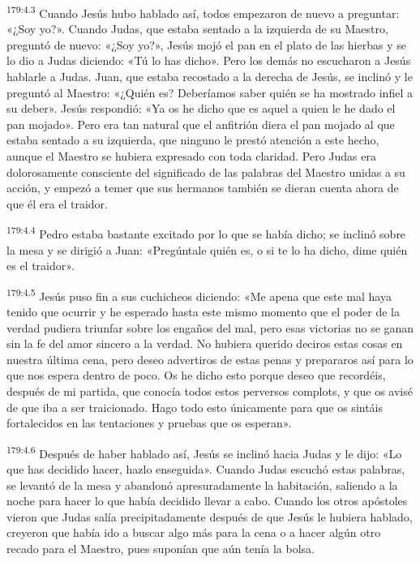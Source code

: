 \par 
\textsuperscript{179:4.3} Cuando Jesús hubo hablado así, todos empezaron de nuevo a preguntar: «¿Soy yo?». Cuando Judas, que estaba sentado a la izquierda de su Maestro, preguntó de nuevo: «¿Soy yo?», Jesús mojó el pan en el plato de las hierbas y se lo dio a Judas diciendo: «Tú lo has dicho». Pero los demás no escucharon a Jesús hablarle a Judas. Juan, que estaba recostado a la derecha de Jesús, se inclinó y le preguntó al Maestro: «¿Quién es? Deberíamos saber quién se ha mostrado infiel a su deber». Jesús respondió: «Ya os he dicho que es aquel a quien le he dado el pan mojado». Pero era tan natural que el anfitrión diera el pan mojado al que estaba sentado a su izquierda, que ninguno le prestó atención a este hecho, aunque el Maestro se hubiera expresado con toda claridad. Pero Judas era dolorosamente consciente del significado de las palabras del Maestro unidas a su acción, y empezó a temer que sus hermanos también se dieran cuenta ahora de que él era el traidor.

\par 
\textsuperscript{179:4.4} Pedro estaba bastante excitado por lo que se había dicho; se inclinó sobre la mesa y se dirigió a Juan: «Pregúntale quién es, o si te lo ha dicho, dime quién es el traidor».

\par 
\textsuperscript{179:4.5} Jesús puso fin a sus cuchicheos diciendo: «Me apena que este mal haya tenido que ocurrir y he esperado hasta este mismo momento que el poder de la verdad pudiera triunfar sobre los engaños del mal, pero esas victorias no se ganan sin la fe del amor sincero a la verdad. No hubiera querido deciros estas cosas en nuestra última cena, pero deseo advertiros de estas penas y prepararos así para lo que nos espera dentro de poco. Os he dicho esto porque deseo que recordéis, después de mi partida, que conocía todos estos perversos complots, y que os avisé de que iba a ser traicionado. Hago todo esto únicamente para que os sintáis fortalecidos en las tentaciones y pruebas que os esperan».

\par 
\textsuperscript{179:4.6} Después de haber hablado así, Jesús se inclinó hacia Judas y le dijo: «Lo que has decidido hacer, hazlo enseguida». Cuando Judas escuchó estas palabras, se levantó de la mesa y abandonó apresuradamente la habitación, saliendo a la noche para hacer lo que había decidido llevar a cabo. Cuando los otros apóstoles vieron que Judas salía precipitadamente después de que Jesús le hubiera hablado, creyeron que había ido a buscar algo más para la cena o a hacer algún otro recado para el Maestro, pues suponían que aún tenía la bolsa.

